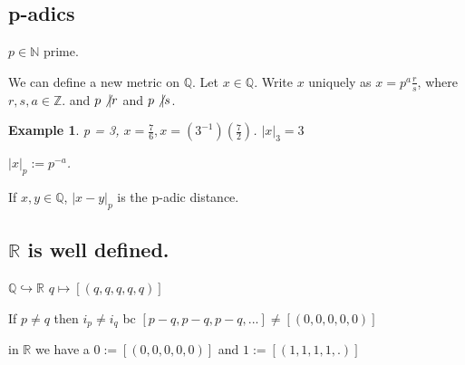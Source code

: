 \documentclass[twoside]{article}
\newcommand{\N}{\mathbb{N}}
\newcommand{\Z}{\mathbb{Z}}
\newcommand{\Q}{\mathbb{Q}}
\newtheorem{example}[theorem]{Example}
\newcommand\R{\mathbb{R}}
\begin{document}
\subsection{p-adics}

$p \in \N$ prime. 

We can define a new metric on $\Q$. Let $x \in \Q$. Write $x$ uniquely as $x = p^a\frac{r}{s}$, where $r,s,a \in \Z$. 
and $p \not\vert r$ and $p \not\vert s$. 
\begin{example}
    p = 3, $x = \frac{7}{6}, x = (3^{-1})(\frac72)$. $|x|_3 = 3$

    $|x|_p := p^{-a}$.
\end{example}

If $x,y \in \Q$, $|x-y|_p$ is the p-adic distance. 


\subsection{$\R$ is well defined.}

$\Q \hookrightarrow \R$
$q \mapsto [(q,q,q,q,q)]$

If $p \neq q$ then $i_p \neq i_q$
bc $[p-q, p-q, p-q,...] \neq [(0,0,0,0,0)]$

in $\R$ we have a $0 := [(0,0,0,0,0)]$ and $1 := [(1,1,1,1,.)]$
\end{document}
